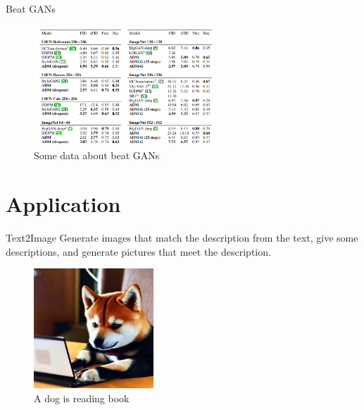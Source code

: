 \documentclass[aspectratio=169]{beamer}
\begin{document}
\begin{frame}{Beat GANs}
    \centering
    \begin{figure}
        \includegraphics[height=4.5cm]{../pic/beat-GANs.png}
        \caption{Some data about beat GANs}
    \end{figure}
\end{frame}



\section{Application}

\begin{frame}{Text2Image}
    Generate images that match the description from the text, give some descriptions, and generate pictures that meet the description.
    \begin{figure}
        \centering
        \includegraphics[height=4.5cm]{../pic/dog-is-reading.png}
        \caption{A dog is reading book}
    \end{figure}
\end{frame}
\end{document}
